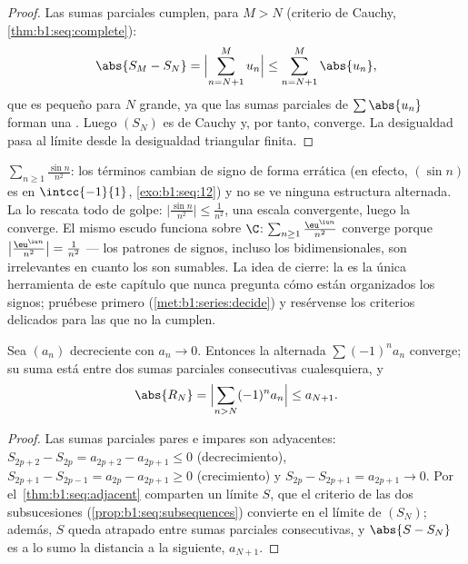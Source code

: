 \begin{proof}
Las sumas parciales cumplen, para $M > N$ (criterio de Cauchy,
\cref{thm:b1:seq:complete}):
\[
\abs{S_M - S_N} = \Bigl| \sum_{n=N+1}^{M} u_n \Bigr|
\leq \sum_{n=N+1}^{M} \abs{u_n},
\]
que es pequeño para $N$ grande, ya que las sumas parciales de
$\sum\abs{u_n}$ forman una . Luego $(S_N)$ es de
Cauchy y, por tanto, converge. La desigualdad pasa al límite desde la
desigualdad triangular finita.
\end{proof}

\begin{example}\label{ex:b1:series:absexamples}
$\sum_{n\geq1} \frac{\sin n}{n^2}$: los términos cambian de signo de
forma errática (en efecto, $(\sin n)$ es  en $\intcc{-1}{1}$,
\cref{exo:b1:seq:12}) y no se ve ninguna estructura alternada. La
 lo rescata todo de golpe:
$\bigl|\frac{\sin n}{n^2}\bigr| \leq \frac{1}{n^2}$, una escala
convergente, luego la  converge. El mismo escudo funciona
sobre $\C$: $\sum_{n\geq1}\frac{\eu^{\iu n}}{n^2}$ converge porque
$\bigl|\frac{\eu^{\iu n}}{n^2}\bigr| = \frac{1}{n^2}$ --- los
patrones de signos, incluso los bidimensionales, son irrelevantes en
cuanto los  son sumables. La idea de cierre: la
 es la única herramienta de este capítulo que
nunca pregunta cómo están organizados los signos; pruébese primero
(\cref{met:b1:series:decide}) y resérvense los criterios delicados
para las  que no la cumplen.
\end{example}

\begin{theorem}\label{thm:b1:series:alternating}
Sea $(a_n)$ decreciente con $a_n \to 0$. Entonces la  alternada
$\sum (-1)^n a_n$ converge; su suma está entre dos sumas parciales
consecutivas cualesquiera, y
\[
\abs{R_N} = \Bigl| \sum_{n > N} (-1)^n a_n \Bigr| \leq a_{N+1} .
\]
\end{theorem}

\begin{proof}
Las sumas parciales pares e impares son adyacentes:
$S_{2p+2} - S_{2p} = a_{2p+2} - a_{2p+1} \leq 0$ (decrecimiento),
$S_{2p+1} - S_{2p-1} = a_{2p} - a_{2p+1} \geq 0$ (crecimiento) y
$S_{2p} - S_{2p+1} = a_{2p+1} \to 0$. Por
el~\cref{thm:b1:seq:adjacent} comparten un límite $S$, que el
criterio de las dos subsucesiones
(\cref{prop:b1:seq:subsequences}) convierte en el límite de $(S_N)$;
además, $S$ queda atrapado entre sumas parciales consecutivas, y
$\abs{S - S_N}$ es a lo sumo la distancia a la siguiente, $a_{N+1}$.
\end{proof}

